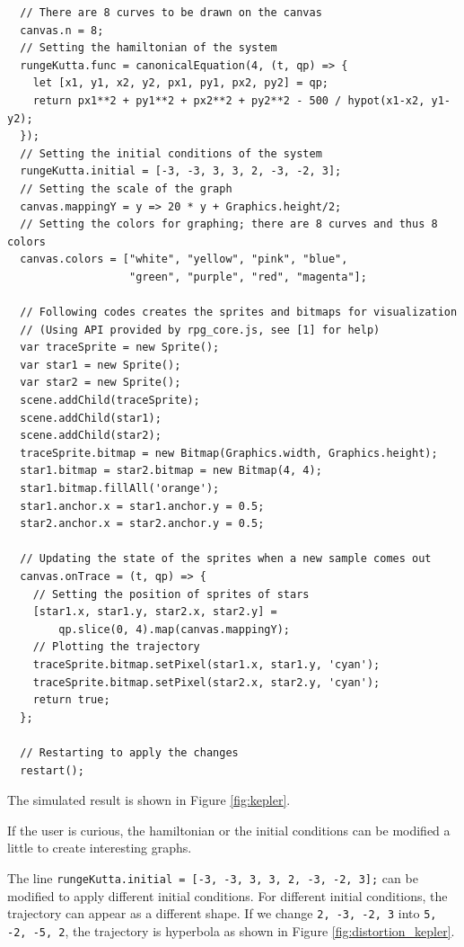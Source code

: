 \documentclass[12pt]{article}
\begin{document}
\begin{verbatim}
  // There are 8 curves to be drawn on the canvas
  canvas.n = 8;
  // Setting the hamiltonian of the system
  rungeKutta.func = canonicalEquation(4, (t, qp) => {
    let [x1, y1, x2, y2, px1, py1, px2, py2] = qp;
    return px1**2 + py1**2 + px2**2 + py2**2 - 500 / hypot(x1-x2, y1-y2);
  });
  // Setting the initial conditions of the system
  rungeKutta.initial = [-3, -3, 3, 3, 2, -3, -2, 3];
  // Setting the scale of the graph
  canvas.mappingY = y => 20 * y + Graphics.height/2;
  // Setting the colors for graphing; there are 8 curves and thus 8 colors
  canvas.colors = ["white", "yellow", "pink", "blue",
                   "green", "purple", "red", "magenta"];

  // Following codes creates the sprites and bitmaps for visualization
  // (Using API provided by rpg_core.js, see [1] for help)
  var traceSprite = new Sprite();
  var star1 = new Sprite();
  var star2 = new Sprite();
  scene.addChild(traceSprite);
  scene.addChild(star1);
  scene.addChild(star2);
  traceSprite.bitmap = new Bitmap(Graphics.width, Graphics.height);
  star1.bitmap = star2.bitmap = new Bitmap(4, 4);
  star1.bitmap.fillAll('orange');
  star1.anchor.x = star1.anchor.y = 0.5;
  star2.anchor.x = star2.anchor.y = 0.5;

  // Updating the state of the sprites when a new sample comes out
  canvas.onTrace = (t, qp) => {
    // Setting the position of sprites of stars
    [star1.x, star1.y, star2.x, star2.y] =
        qp.slice(0, 4).map(canvas.mappingY);
    // Plotting the trajectory
    traceSprite.bitmap.setPixel(star1.x, star1.y, 'cyan');
    traceSprite.bitmap.setPixel(star2.x, star2.y, 'cyan');
    return true;
  };

  // Restarting to apply the changes
  restart();
\end{verbatim}

The simulated result is shown in Figure \ref{fig:kepler}.

If the user is curious, the hamiltonian or the initial conditions can be modified a little to create interesting graphs.

The line \texttt{rungeKutta.initial = [-3, -3, 3, 3, 2, -3, -2, 3];}
can be modified to apply different initial conditions.
For different initial conditions, the trajectory can appear as a different shape.
If we change \texttt{2, -3, -2, 3} into \texttt{5, -2, -5, 2},
the trajectory is hyperbola as shown in Figure \ref{fig:distortion_kepler}.
\end{document}
